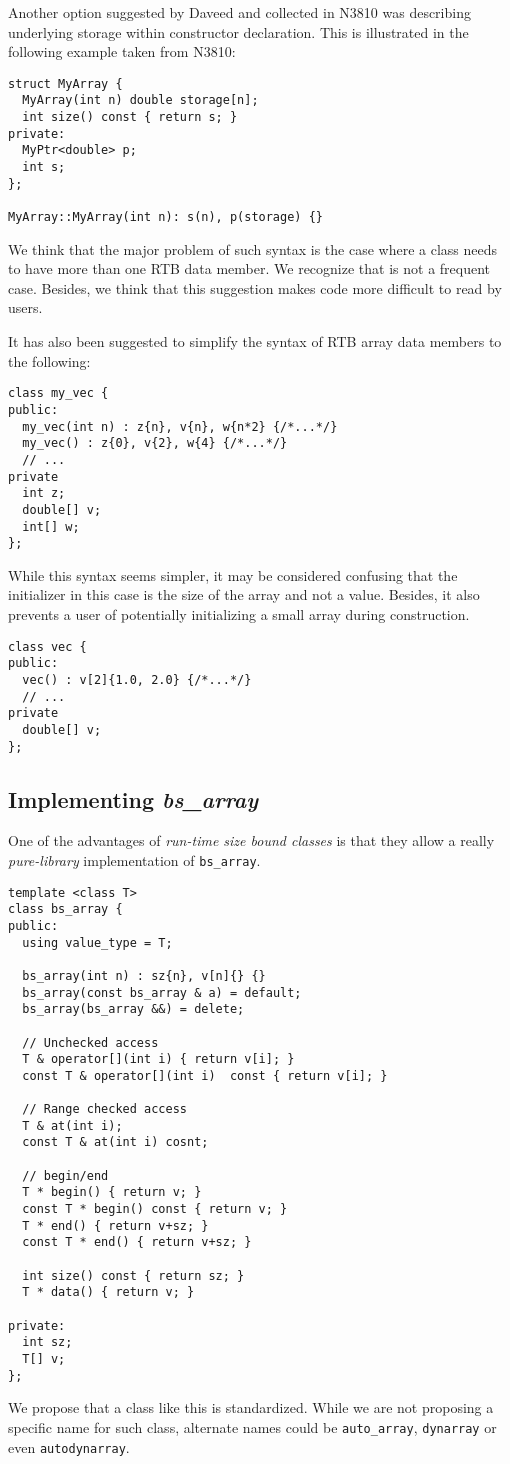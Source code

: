 Another option suggested by Daveed and collected in N3810 was describing
underlying storage within constructor declaration. This is illustrated in the
following example taken from N3810:

\begin{lstlisting}
struct MyArray {
  MyArray(int n) double storage[n];
  int size() const { return s; }
private:
  MyPtr<double> p;
  int s;
};

MyArray::MyArray(int n): s(n), p(storage) {}
\end{lstlisting}

We think that the major problem of such syntax is the case where a class needs
to have more than one RTB data member. We recognize that is not a frequent case.
Besides, we think that this suggestion makes code more difficult to read by
users.

It has also been suggested to simplify the syntax of RTB array data members to
the following:

\begin{lstlisting}
class my_vec {
public:
  my_vec(int n) : z{n}, v{n}, w{n*2} {/*...*/}
  my_vec() : z{0}, v{2}, w{4} {/*...*/}
  // ...
private
  int z;
  double[] v;
  int[] w;
};
\end{lstlisting}

While this syntax seems simpler, it may be considered confusing that the
initializer in this case is the size of the array and not a value. Besides, it
also prevents a user of potentially initializing a small array during
construction.

\begin{lstlisting}
class vec {
public:
  vec() : v[2]{1.0, 2.0} {/*...*/}
  // ...
private
  double[] v;
};
\end{lstlisting}

\subsection{Implementing \emph{bs\_array}}

One of the advantages of \emph{run-time size bound classes} is that they allow a
really \emph{pure-library} implementation of \verb+bs_array+.

\begin{lstlisting}
template <class T>
class bs_array {
public:
  using value_type = T;

  bs_array(int n) : sz{n}, v[n]{} {}
  bs_array(const bs_array & a) = default;
  bs_array(bs_array &&) = delete;

  // Unchecked access
  T & operator[](int i) { return v[i]; }
  const T & operator[](int i)  const { return v[i]; }

  // Range checked access
  T & at(int i);
  const T & at(int i) cosnt;

  // begin/end
  T * begin() { return v; }
  const T * begin() const { return v; }
  T * end() { return v+sz; }
  const T * end() { return v+sz; }

  int size() const { return sz; }
  T * data() { return v; }

private:
  int sz;
  T[] v;
};
\end{lstlisting}

We propose that a class like this is standardized. While we are not proposing a
specific name for such class, alternate names could be \verb+auto_array+,
\verb+dynarray+ or even \verb+autodynarray+.
